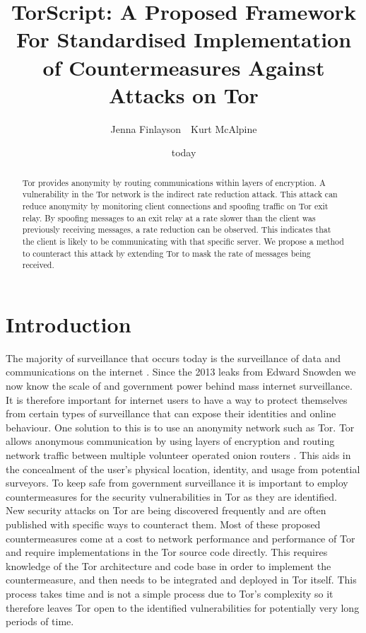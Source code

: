 \documentclass[9pt,technote]{IEEEtran}
\title{TorScript: A Proposed Framework For Standardised Implementation of Countermeasures Against Attacks on Tor}
\date{today}
\author{Jenna Finlayson~~Kurt McAlpine}
\begin{document}
 
\maketitle

\begin{abstract} Tor provides anonymity by routing communications within layers
of encryption. A vulnerability in the Tor network is the indirect rate reduction
attack. This attack can reduce anonymity by monitoring client connections and
spoofing traffic on Tor exit relay. By spoofing messages to an exit relay at a
rate slower than the client was previously receiving messages, a rate reduction
can be observed. This indicates that the client is likely to be communicating
with that specific server. We propose a method to counteract this attack by
extending Tor to mask the rate of messages being received. \end{abstract}

\section{Introduction} 
The majority of surveillance that occurs today is the surveillance of data and communications on the internet \cite{diffie2008brave}. Since the 2013 leaks from Edward Snowden we now know the scale of and government power behind mass internet surveillance. It is therefore important for internet users to have a way to protect themselves from certain types of surveillance that can expose their identities and online behaviour. One solution to this is to use an anonymity network such as Tor. Tor allows anonymous communication by using layers of encryption and routing network traffic between multiple volunteer operated onion routers \cite{tor}. This aids in the concealment of the
user's physical location, identity, and usage from potential surveyors. To keep
safe from government surveillance it is important to employ countermeasures for the security vulnerabilities in Tor as they are identified.\\

New security attacks on Tor are being discovered frequently and are often published with specific ways to counteract them. Most of these proposed countermeasures come at a cost to network performance and performance of Tor and require implementations in the Tor source code directly. This requires knowledge of the Tor architecture and code base in order to implement the countermeasure, and then needs to be integrated and deployed in Tor itself. This process takes time and is not a simple process due to Tor's complexity so it therefore leaves Tor open to the identified vulnerabilities for potentially very long periods of time. \\
\end{document}
